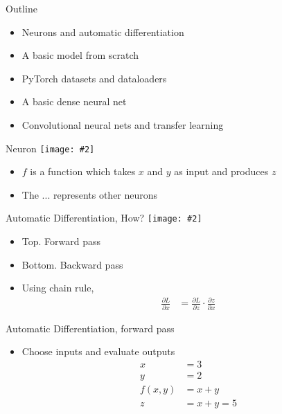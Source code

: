\documentclass[hyperref={pdfpagelabels=false},12pt]{beamer}
\newcommand{\ig}[2]{\texttt{[image: \#2]}}
\begin{document}
\begin{frame}{Outline}
  \begin{itemize}
    \item Neurons and automatic differentiation
    \item A basic model from scratch
    \item PyTorch datasets and dataloaders
    \item A basic dense neural net
    \item Convolutional neural nets and transfer learning
  \end{itemize}
\end{frame}

\begin{frame}{Neuron}
  \centering
  \ig{0.75}{figures/neuron.png}
  \begin{itemize}
      \item $f$ is a function which takes $x$ and $y$ as input and produces $z$
      \item The $...$ represents other neurons
  \end{itemize}
\end{frame}

\begin{frame}{Automatic Differentiation, How?}
  \centering
  \ig{0.5}{figures/autograd.png}
  \begin{itemize}
      \item Top. Forward pass
      \item Bottom. Backward pass
      \item Using chain rule,
        \begin{align*}
          \frac{\partial L}{\partial x} &= \frac{\partial L}{\partial z} \cdot
                    \frac{\partial z}{\partial x}
        \end{align*}
  \end{itemize}
\end{frame}

\begin{frame}{Automatic Differentiation, forward pass}
  \begin{itemize}
    \item Choose inputs and evaluate outputs
      \begin{align*}
        x &= 3 \\
        y &= 2 \\
        f(x, y) &= x + y \\
        z &= x + y = 5
      \end{align*}
  \end{itemize}
\end{frame}
\end{document}
